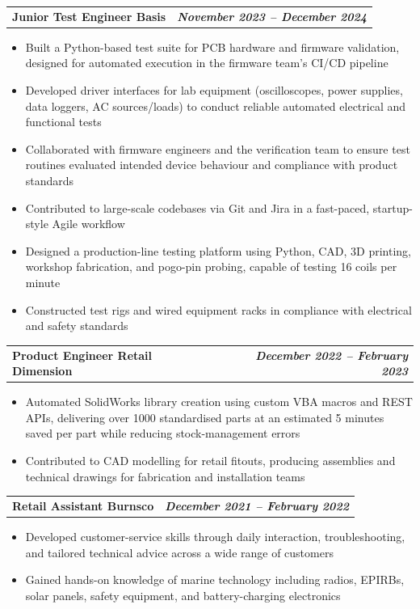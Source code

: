 \documentclass[11pt, a4paper]{article}
\makeatletter
\newcommand{\cventry}[2]{%
  \vspace{2pt}%
  \noindent
  \begin{tabularx}{\linewidth}{@{}X r@{}}
    \textbf{#1} & \textbf{\textit{#2}}
  \end{tabularx}%
  \vspace{1pt}%
}
\makeatother
\begin{document}
\cventry{Junior Test Engineer \textbar{} Basis}{November 2023 – December 2024}
\begin{itemize}
  \item Built a Python-based test suite for PCB hardware and firmware validation,
        designed for automated execution in the firmware team's CI/CD pipeline
  \item Developed driver interfaces for lab equipment (oscilloscopes, power supplies,
        data loggers, AC sources/loads) to conduct reliable automated electrical and
        functional tests
  \item Collaborated with firmware engineers and the verification team to ensure test
        routines evaluated intended device behaviour and compliance with product
        standards
  \item Contributed to large-scale codebases via Git and Jira in a fast-paced,
        startup-style Agile workflow
  \item Designed a production-line testing platform using Python, CAD, 3D printing,
        workshop fabrication, and pogo-pin probing, capable of testing 16 coils per
        minute
  \item Constructed test rigs and wired equipment racks in compliance with electrical
        and safety standards
\end{itemize}

\cventry{Product Engineer \textbar{} Retail Dimension}{December 2022 – February 2023}
\begin{itemize}
  \item Automated SolidWorks library creation using custom VBA macros and REST APIs,
        delivering over 1000 standardised parts at an estimated 5 minutes saved per
        part while reducing stock-management errors
  \item Contributed to CAD modelling for retail fitouts, producing assemblies and
        technical drawings for fabrication and installation teams
\end{itemize}

\cventry{Retail Assistant \textbar{} Burnsco}{December 2021 – February 2022}
\begin{itemize}
  \item Developed customer-service skills through daily interaction, troubleshooting,
        and tailored technical advice across a wide range of customers
  \item Gained hands-on knowledge of marine technology including radios, EPIRBs, solar
        panels, safety equipment, and battery-charging electronics
\end{itemize}
\end{document}
